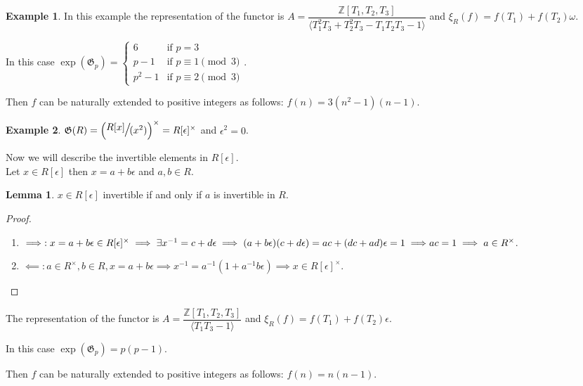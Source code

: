 \documentclass{article}
\theoremstyle{definition}
\newtheorem{example}{Example}
\theoremstyle{definition}
\newtheorem{lemma}{Lemma}
\begin{document}
\begin{example}
In this example the representation of the functor is $A = \dfrac{\mathbb{Z}[T_1, T_2, T_3]}{\langle 
    T_1^2T_3+T_2^2T_3-T_1T_2T_3-1\rangle}$ and $\xi_R(f)=f(T_1)+f(T_2)\omega$.

In this case $\operatorname{exp}(\mathfrak{G}_p) = \begin{cases} 
    6 & \text{if } p = 3\\
    p - 1 & \text{if } p \equiv 1 \pmod{3}\\
    p^2 - 1 & \text{if } p \equiv 2 \pmod{3}
\end{cases}.$

Then $f$ can be naturally extended to positive integers as follows: $f(n) = 3(n^2 - 1)(n - 1)$.
\end{example}

\begin{example}
    $\mathfrak{G}(R) = \Large{\left( \sfrac{R[x]}{ (x^2)}\right)^{\times}} =  R[\epsilon]^{\times}$ and $\epsilon^2 = 0$.

 Now we will describe the invertible elements in $R[\epsilon].$\\
    Let $x \in  R[\epsilon]$ then $x = a + b\epsilon$ and $a,b \in R.$
 \begin{lemma}
        $x \in R[\epsilon]$ invertible if and only if $a$ is invertible in $R$.
    \end{lemma}
\begin{proof}
\hspace*{5cm}
\begin{enumerate}
    \item $\implies: x = a + b\epsilon \in R[\epsilon]^{\times} \implies \exists x^{-1} = c + d\epsilon \implies 
    (a+b\epsilon)(c +d\epsilon) = ac + (dc+ ad)\epsilon = 1 \implies\\
    ac = 1\implies a \in R^{\times}$.
    \item  $\impliedby: a \in R^{\times}, b \in R, x = a + b\epsilon \implies x^{-1} = a^{-1}(1 + a^{-1}b\epsilon) 
    \implies x  \in R[\epsilon]^{\times}.$
\end{enumerate}
\end{proof}

The representation of the functor is $A = \dfrac{\mathbb{Z}[T_1, T_2, T_3]}{\langle T_1T_3-1\rangle}$ and 
$\xi_R(f)=f(T_1)+f(T_2)\epsilon$.

In this case $\operatorname{exp}(\mathfrak{G}_p) = p(p - 1).$

Then $f$ can be naturally extended to positive integers as follows: $f(n) = n(n - 1)$.\\
\end{example}
\end{document}
